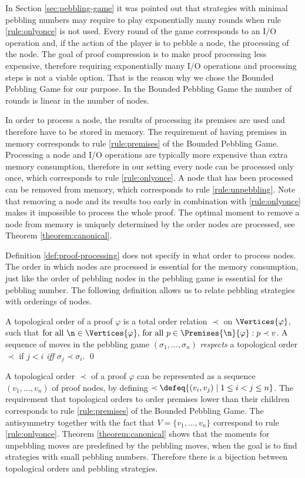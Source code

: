In Section \ref{sec:pebbling-game} it was pointed out that strategies with minimal pebbling numbers may require to play exponentially many rounds when rule \ref{rule:onlyonce} is not used.
Every round of the game corresponds to an I/O operation and, if the action of the player is to pebble a node, the processing of the node.
The goal of proof compression is to make proof processing less expensive, therefore requiring exponentially many I/O operations and processing steps is not a viable option.
That is the reason why we chose the Bounded Pebbling Game for our purpose.
In the Bounded Pebbling Game the number of rounds is linear in the number of nodes.

In order to process a node, the results of processing its premises are used and therefore have to be stored in memory.
The requirement of having premises in memory corresponds to rule \ref{rule:premises} of the Bounded Pebbling Game. 
Processing a node and I/O operations are typically more expensive than extra memory consumption, therefore in our setting every node can be processed only once, which corresponds to rule \ref{rule:onlyonce}.
A node that has been processed can be removed from memory, which corresponds to rule \ref{rule:unpebbling}.
Note that removing a node and its results too early in combination with \ref{rule:onlyonce} makes it impossible to process the whole proof.
The optimal moment to remove a node from memory is uniquely determined by the order nodes are processed, see Theorem \ref{theorem:canonical}.

Definition \ref{def:proof-processing} does not specify in what order to process nodes.
The order in which nodes are processed is essential for the memory consumption, just like the order of pebbling nodes in the pebbling game is essential for the pebbling number.
The following definition allows us to relate pebbling strategies with orderings of nodes.

\begin{definition}
\label{def:topological-order}
A topological order of a proof $\varphi$ is a total order relation $\prec$ on $\Vertices{\varphi}$, such that 
$\text{for all } \n \in \Vertices{\varphi} \text{, for all } p \in \Premises{\n}{\varphi}:
p \prec v$.
A sequence of moves in the pebbling game $(\sigma_1,\ldots,\sigma_n)$ \emph{respects} a topological order $\prec$ if $j < i$ \emph{iff} $\sigma_j \prec \sigma_i$.
\qed
\end{definition}

A topological order $\prec$ of a proof $\varphi$ can be represented as a sequence $(v_1,\dots,v_n)$ of proof nodes, by defining $\prec \defeq \{(v_i,v_j) \mid 1 \leq i < j \leq n\}$. 
The requirement that topological orders to order premises lower than their children corresponds to rule \ref{rule:premises} of the Bounded Pebbling Game.
The antisymmetry together with the fact that $V = \{v_1,\dots,v_n\}$ correspond to rule \ref{rule:onlyonce}.
Theorem \ref{theorem:canonical} shows that the moments for unpebbling moves are predefined by the pebbling moves, when the goal is to find strategies with small pebbling numbers.
Therefore there is a bijection between topological orders and pebbling strategies.

